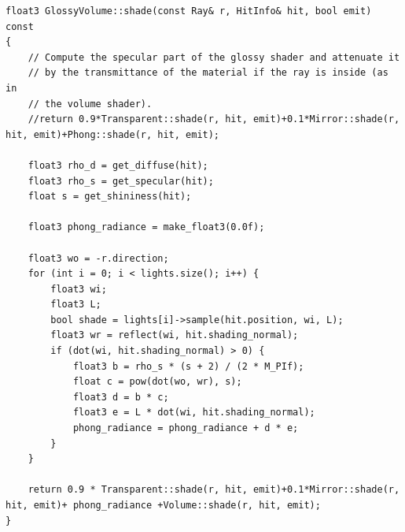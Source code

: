 \begin{lstlisting}
float3 GlossyVolume::shade(const Ray& r, HitInfo& hit, bool emit) const
{
	// Compute the specular part of the glossy shader and attenuate it
	// by the transmittance of the material if the ray is inside (as in
	// the volume shader).
	//return 0.9*Transparent::shade(r, hit, emit)+0.1*Mirror::shade(r, hit, emit)+Phong::shade(r, hit, emit);
	
	float3 rho_d = get_diffuse(hit);
	float3 rho_s = get_specular(hit);
	float s = get_shininess(hit);
	
	float3 phong_radiance = make_float3(0.0f);
	
	float3 wo = -r.direction;
	for (int i = 0; i < lights.size(); i++) {
		float3 wi;
		float3 L;
		bool shade = lights[i]->sample(hit.position, wi, L);
		float3 wr = reflect(wi, hit.shading_normal);
		if (dot(wi, hit.shading_normal) > 0) {
			float3 b = rho_s * (s + 2) / (2 * M_PIf);
			float c = pow(dot(wo, wr), s);
			float3 d = b * c;
			float3 e = L * dot(wi, hit.shading_normal);
			phong_radiance = phong_radiance + d * e;
		}
	}
	
	return 0.9 * Transparent::shade(r, hit, emit)+0.1*Mirror::shade(r, hit, emit)+ phong_radiance +Volume::shade(r, hit, emit);
}
\end{lstlisting}

